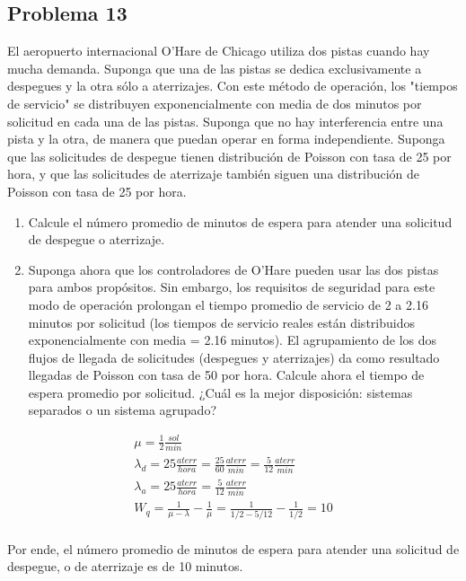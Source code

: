 \documentclass{article}
\begin{document}
        \subsection*{Problema 13}

            El aeropuerto internacional O'Hare de Chicago utiliza dos pistas cuando hay mucha demanda. Suponga que una de las pistas se dedica exclusivamente a despegues y la otra sólo a aterrizajes. Con este método de operación, los "tiempos de servicio" se distribuyen exponencialmente con media de dos minutos por solicitud en cada una de las pistas. Suponga que no hay interferencia entre una pista y la otra, de manera que puedan operar en forma independiente. Suponga que las solicitudes de despegue tienen distribución de Poisson con tasa de 25 por hora, y que las solicitudes de aterrizaje también siguen una distribución de Poisson con tasa de 25 por hora.
            
            \begin{enumerate}
                \item Calcule el número promedio de minutos de espera para atender una solicitud de despegue o aterrizaje.
                \item Suponga ahora que los controladores de O'Hare pueden usar las dos pistas para ambos propósitos. Sin embargo, los requisitos de seguridad para este modo de operación prolongan el tiempo promedio de servicio de 2 a 2.16 minutos por solicitud (los tiempos de servicio reales están distribuidos exponencialmente con media = 2.16 minutos). El agrupamiento de los dos flujos de llegada de solicitudes (despegues y aterrizajes) da como resultado llegadas de Poisson con tasa de 50 por hora. Calcule ahora el tiempo de espera promedio por solicitud. ¿Cuál es la mejor disposición: sistemas separados o un sistema agrupado?
            \end{enumerate}

            \begin{gather*}
                \mu = \frac{1}{2} \frac{sol}{min} \\
                \lambda_d = 25 \frac{aterr}{hora} = \frac{25}{60} \frac{aterr}{min} = \frac{5}{12} \frac{aterr}{min} \\
                \lambda_a = 25 \frac{aterr}{hora} = \frac{5}{12} \frac{aterr}{min} \\
                W_q = \frac{1}{\mu - \lambda} - \frac{1}{\mu} = \frac{1}{1/2 - 5/12} - \frac{1}{1/2} = 10 \\
            \end{gather*}
            
            Por ende, el número promedio de minutos de espera para atender una solicitud de despegue, o de aterrizaje es de 10 minutos.
\end{document}
